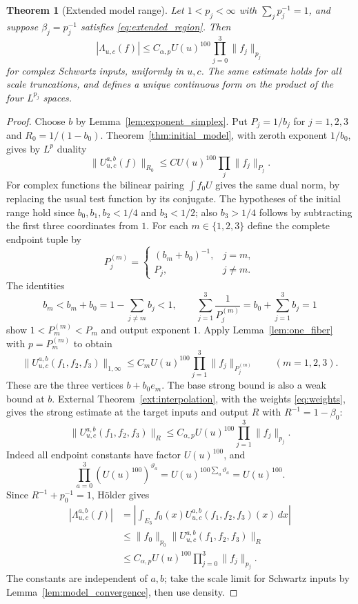 \documentclass[12pt,reqno]{amsart}
\theoremstyle{plain}
\newtheorem{theorem}{Theorem}[section]
\theoremstyle{definition}
\theoremstyle{remark}
\numberwithin{equation}{section}
\newcommand{\dd}{\,d}
\begin{document}
\begin{theorem}[Extended model range]\label{thm:extended_model}
Let $1<p_j<\infty$ with $\sum_jp_j^{-1}=1$, and suppose
$\beta_j=p_j^{-1}$ satisfies \eqref{eq:extended_region}. Then
\[
 |\Lambda_{u,c}(f)|\le C_{\alpha,p}U(u)^{100}\prod_{j=0}^3\|f_j\|_{p_j}
\]
for complex Schwartz inputs, uniformly in $u,c$. The same estimate
holds for all scale truncations, and defines a unique continuous form
on the product of the four $L^{p_j}$ spaces.
\end{theorem}
\begin{proof}
Choose $b$ by Lemma~\ref{lem:exponent_simplex}. Put
$P_j=1/b_j$ for $j=1,2,3$ and $R_0=1/(1-b_0)$.
Theorem~\ref{thm:initial_model}, with zeroth exponent $1/b_0$,
gives by $L^p$ duality
\[
 \|U^{a,b}_{u,c}(f)\|_{R_0}\le C U(u)^{100}\prod_j\|f_j\|_{P_j}.
\]
For complex functions the bilinear pairing $\int f_0U$ gives the
same dual norm, by replacing the usual test function by its conjugate.
The hypotheses of the initial range hold since $b_0,b_1,b_2<1/4$
and $b_3<1/2$; also $b_3>1/4$ follows by subtracting the first
three coordinates from $1$.
For each $m\in\{1,2,3\}$ define the complete endpoint tuple by
\[
 P_j^{(m)}=\begin{cases}
        (b_m+b_0)^{-1},&j=m,\\
        P_j,&j\ne m.
        \end{cases}
\]
The identities
\[
 b_m<b_m+b_0=1-\sum_{j\ne m}b_j<1,\qquad
 \sum_{j=1}^3\frac1{P_j^{(m)}}=
           b_0+\sum_{j=1}^3b_j=1
\]
show $1<P_m^{(m)}<P_m$ and output exponent $1$. Apply
Lemma~\ref{lem:one_fiber} with $p=P_m^{(m)}$ to obtain
\begin{equation}\label{eq:interpolation_weak_endpoints}
 \|U^{a,b}_{u,c}(f_1,f_2,f_3)\|_{1,\infty}
 \le C_m U(u)^{100}\prod_{j=1}^3\|f_j\|_{P_j^{(m)}}
                  \qquad(m=1,2,3).
\end{equation}
These are the three vertices $b+b_0e_m$.
The base strong bound is also a weak bound at $b$.
External Theorem~\ref{ext:interpolation}, with the weights
\eqref{eq:weights}, gives the strong estimate at the target inputs
and output $R$ with $R^{-1}=1-\beta_0$:
\begin{equation}\label{eq:extended_operator_bound}
 \|U^{a,b}_{u,c}(f_1,f_2,f_3)\|_R
 \le C_{\alpha,p} U(u)^{100}\prod_{j=1}^3\|f_j\|_{p_j}.
\end{equation}
Indeed all endpoint constants have factor $U(u)^{100}$, and
\[
 \prod_{a=0}^3(U(u)^{100})^{\vartheta_a}
 =U(u)^{100\sum_a\vartheta_a}=U(u)^{100}.
\]
Since $R^{-1}+p_0^{-1}=1$, H\"older gives
\begin{align*}
 |\Lambda^{a,b}_{u,c}(f)|
 &=\left|\int_{E_3}f_0(x)U^{a,b}_{u,c}(f_1,f_2,f_3)(x)\dd x\right|\\
 &\le\|f_0\|_{p_0}\|U^{a,b}_{u,c}(f_1,f_2,f_3)\|_R\\
 &\le C_{\alpha,p}U(u)^{100}\prod_{j=0}^3\|f_j\|_{p_j}.
\end{align*}
The constants are independent of $a,b$; take the scale limit for
Schwartz inputs by Lemma~\ref{lem:model_convergence}, then use density.
\end{proof}
\end{document}
